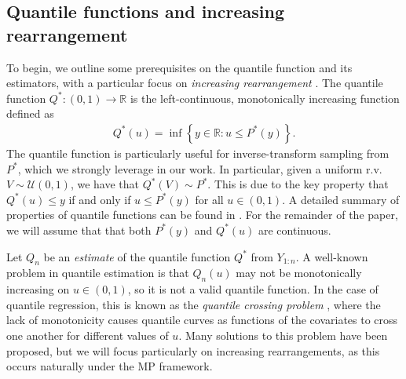 \documentclass[11pt,a4paper]{article}
\newcommand{\R}{\mathbb{R}}
\begin{document}
\subsection{Quantile functions and increasing rearrangement}
To begin, we outline some prerequisites on the quantile function and its estimators, with a particular focus on \textit{increasing rearrangement} \citep{Chernozhukov2010}. 
 The quantile function $Q^*: (0,1) \to \R$  is the left-continuous, monotonically increasing function defined as
\begin{align*}
    Q^*(u) = \inf\left\{y \in \R: u \leq P^*(y)\right\}.
\end{align*}
The quantile function is particularly useful for inverse-transform sampling from $P^*$, which we strongly leverage in our work. In particular, given a uniform r.v. $V \sim \mathcal{U}(0,1)$, we have that $Q^*(V) \sim P^*$. 
{This is due to the key property that $Q^*(u) \leq y$ if and only if $u \leq P^*(y)$ for all $u \in (0,1)$.} A detailed summary of properties of quantile functions can be found in \citet{Embrechts2013}. For the remainder of the paper, we will assume that that both $P^*(y)$ and $Q^*(u)$ are continuous.


Let $Q_n$ be an \textit{estimate} of the quantile function $Q^*$ from $Y_{1:n}$. A well-known problem in quantile estimation is that $Q_n(u)$ may not be monotonically increasing on $u\in (0,1)$, so it is not a valid quantile function. In the case of quantile regression, this is known as the \textit{quantile crossing problem} \citep{Bassett1982,He1997,Chernozhukov2010}, where the lack of monotonicity causes quantile curves as functions of the covariates to cross one another for different values of $u$. Many solutions to this problem have been proposed, but we will focus particularly on increasing rearrangements, as this occurs naturally under the MP framework. 
\end{document}
